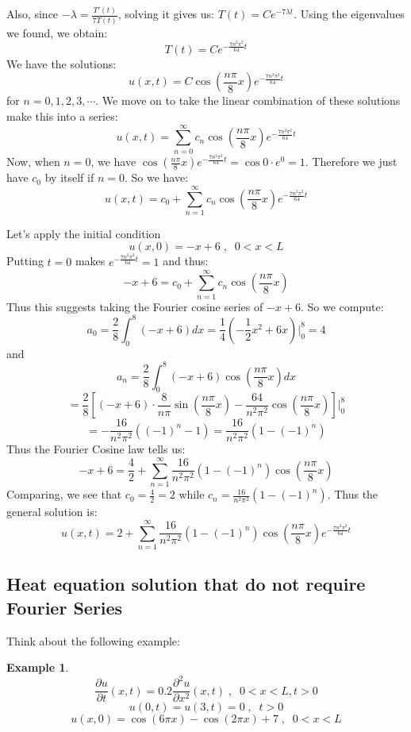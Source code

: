\documentclass[12pt]{report}
\newtheorem{ex}{Example}[section]
\begin{document}
Also, since $-\lambda=\frac{T'(t)}{7T(t)}$, solving it gives us: $T(t) = C e^{-7\lambda t}$. Using the eigenvalues we found, we obtain:
$$T(t) =  C e^{-\frac{7n^2 \pi^2}{64} t}$$
We have the solutions:
$$u(x,t) = C \cos \left( \frac{n \pi}{8} x \right) e^{-\frac{7n^2 \pi^2}{64} t}$$
for $n=0,1,2,3, \cdots $.
We move on to take the linear combination of these solutions  make this into a series:
$$u(x,t) = \sum_{n=0}^{\infty} c_n \cos \left( \frac{n \pi}{8} x \right) e^{-\frac{7n^2 \pi^2}{64} t}$$
Now, when $n=0$, we have $\cos \left( \frac{n \pi}{8} x \right) e^{-\frac{7n^2 \pi^2}{64} t} =\cos 0 \cdot e^0 = 1$. Therefore we just have $c_0$ by itself if $n=0$. So we have:
$$u(x,t) = c_0 + \sum_{n=1}^{\infty} c_n \cos \left( \frac{n \pi}{8} x \right) e^{-\frac{7n^2 \pi^2}{64} t}$$

Let's apply the initial condition
$$u(x,0)=-x+6  \; , \; \; 0<x<L$$
Putting $t=0$ makes $e^{-\frac{7n^2 \pi^2}{64} t}=1$ and thus:
$$-x+6 = c_0 + \sum_{n=1}^{\infty} c_n \cos \left( \frac{n \pi}{8} x \right) $$
Thus this suggests taking the Fourier cosine series of $-x+6$. So we compute:
$$a_0 = \frac{2}{8} \int_0^8 (-x+6) dx = \frac{1}{4} \left( -\frac{1}{2}x^2 + 6x \right) \Bigg\vert_0^8 = 4$$
and
$$a_n = \frac{2}{8} \int_0^8 (-x+6) \cos \left( \frac{n \pi}{8} x \right) dx $$
$$ = \frac{2}{8} \left[ (-x+6)\cdot \frac{8}{n \pi} \sin \left( \frac{n \pi}{8} x \right) - \frac{64}{n^2 \pi^2} \cos \left( \frac{n \pi}{8} x \right) \right] \Bigg\vert_0^8$$
$$ =  - \frac{16}{n^2 \pi^2} \left( (-1)^n -1 \right) =   \frac{16}{n^2 \pi^2} \left( 1-  (-1)^n \right) $$
Thus the Fourier Cosine law tells us:
$$-x+6 = \frac{4}{2} + \sum_{n=1}^{\infty} \frac{16}{n^2 \pi^2} \left( 1-  (-1)^n \right)  \cos \left( \frac{n \pi}{8} x \right) $$
Comparing, we see that $c_0 =\frac{4}{2} =2$ while $c_n = \frac{16}{n^2 \pi^2} \left( 1-  (-1)^n \right)$. Thus the general solution is:
$$u(x,t) = 2 + \sum_{n=1}^{\infty} \frac{16}{n^2 \pi^2} \left( 1-  (-1)^n \right)  \cos \left( \frac{n \pi}{8} x \right) e^{-\frac{7n^2 \pi^2}{64} t} $$

\subsection*{Heat equation solution that do not require Fourier Series}
Think about the following example:
\begin{ex}
$$\frac{\partial u}{\partial t}(x,t) = 0.2 \frac{\partial^2 u}{\partial x^2}(x,t)\; , \; \; 0<x<L, t>0$$
$$u(0,t)=u(3,t)=0 \; , \; \; t>0$$
$$u(x,0)=\cos(6\pi x) - \cos(2\pi x) + 7  \; , \; \; 0<x<L$$
\end{ex}
\end{document}
